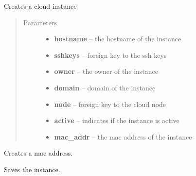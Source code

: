 \documentclass[letterpaper,10pt,english]{sphinxmanual}
\begin{document}
\begin{fulllineitems}
\label{api/cloud:limeade.cloud.models.Instance}
Creates a cloud instance
\begin{quote}\begin{description}
\item[{Parameters}] \leavevmode\begin{itemize}
\item {} 
\textbf{hostname} -- the hostname of the instance

\item {} 
\textbf{sshkeys} -- foreign key to the ssh keys

\item {} 
\textbf{owner} -- the owner of the instance

\item {} 
\textbf{domain} -- domain of the instance

\item {} 
\textbf{node} -- foreign key to the cloud node

\item {} 
\textbf{active} -- indicates if the instance is active

\item {} 
\textbf{mac\_addr} -- the mac address of the instance

\end{itemize}

\end{description}\end{quote}

\begin{fulllineitems}
\label{api/cloud:limeade.cloud.models.Instance.generate_mac_addr}
Creates a mac address.

\end{fulllineitems}


\begin{fulllineitems}
\label{api/cloud:limeade.cloud.models.Instance.save}
Saves the instance.

\end{fulllineitems}


\end{fulllineitems}
\end{document}
